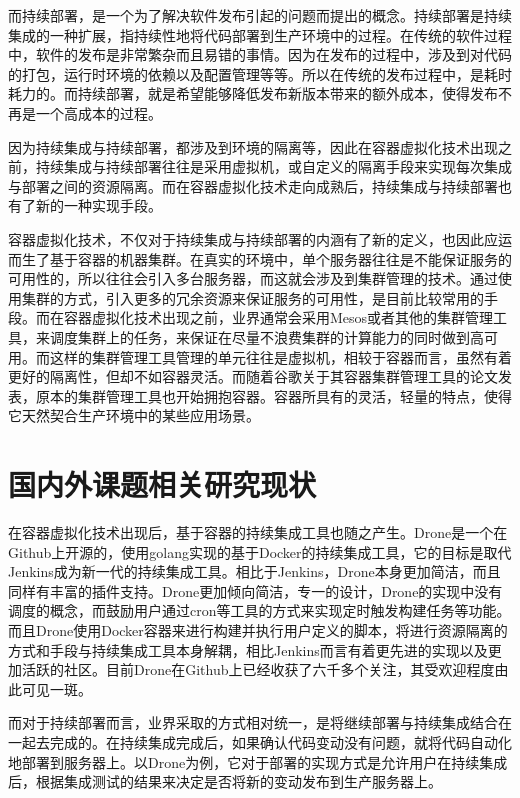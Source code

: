 而持续部署，是一个为了解决软件发布引起的问题而提出的概念。持续部署是持续集成的一种扩展，指持续性地将代码部署到生产环境中的过程。在传统的软件过程中，软件的发布是非常繁杂而且易错的事情。因为在发布的过程中，涉及到对代码的打包，运行时环境的依赖以及配置管理等等。所以在传统的发布过程中，是耗时耗力的。而持续部署，就是希望能够降低发布新版本带来的额外成本，使得发布不再是一个高成本的过程。\cite{CruiseControls}

因为持续集成与持续部署，都涉及到环境的隔离等，因此在容器虚拟化技术出现之前，持续集成与持续部署往往是采用虚拟机，或自定义的隔离手段来实现每次集成与部署之间的资源隔离。而在容器虚拟化技术走向成熟后，持续集成与持续部署也有了新的一种实现手段。

容器虚拟化技术，不仅对于持续集成与持续部署的内涵有了新的定义，也因此应运而生了基于容器的机器集群。在真实的环境中，单个服务器往往是不能保证服务的可用性的，所以往往会引入多台服务器，而这就会涉及到集群管理的技术。通过使用集群的方式，引入更多的冗余资源来保证服务的可用性，是目前比较常用的手段。而在容器虚拟化技术出现之前，业界通常会采用Mesos或者其他的集群管理工具，来调度集群上的任务，来保证在尽量不浪费集群的计算能力的同时做到高可用。而这样的集群管理工具管理的单元往往是虚拟机，相较于容器而言，虽然有着更好的隔离性，但却不如容器灵活。而随着谷歌关于其容器集群管理工具的论文发表\cite{Borg}，原本的集群管理工具也开始拥抱容器。容器所具有的灵活，轻量的特点，使得它天然契合生产环境中的某些应用场景。

\section{国内外课题相关研究现状}

在容器虚拟化技术出现后，基于容器的持续集成工具也随之产生。Drone是一个在Github上开源的，使用golang实现的基于Docker的持续集成工具，它的目标是取代Jenkins成为新一代的持续集成工具。相比于Jenkins，Drone本身更加简洁，而且同样有丰富的插件支持。Drone更加倾向简洁，专一的设计，Drone的实现中没有调度的概念，而鼓励用户通过cron等工具的方式来实现定时触发构建任务等功能。而且Drone使用Docker容器来进行构建并执行用户定义的脚本，将进行资源隔离的方式和手段与持续集成工具本身解耦，相比Jenkins而言有着更先进的实现以及更加活跃的社区。目前Drone在Github上已经收获了六千多个关注，其受欢迎程度由此可见一斑。

而对于持续部署而言，业界采取的方式相对统一，是将继续部署与持续集成结合在一起去完成的。在持续集成完成后，如果确认代码变动没有问题，就将代码自动化地部署到服务器上。以Drone为例，它对于部署的实现方式是允许用户在持续集成后，根据集成测试的结果来决定是否将新的变动发布到生产服务器上。

